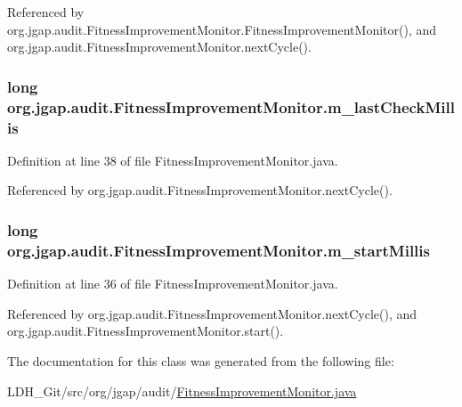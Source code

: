 Referenced by org.\-jgap.\-audit.\-Fitness\-Improvement\-Monitor.\-Fitness\-Improvement\-Monitor(), and org.\-jgap.\-audit.\-Fitness\-Improvement\-Monitor.\-next\-Cycle().

\hypertarget{classorg_1_1jgap_1_1audit_1_1_fitness_improvement_monitor_a5a5a7e91e7951e2cd6c38ca70c288245}{
\subsubsection[{m\-\_\-last\-Check\-Millis}]{\setlength{\rightskip}{0pt plus 5cm}long org.\-jgap.\-audit.\-Fitness\-Improvement\-Monitor.\-m\-\_\-last\-Check\-Millis\hspace{0.3cm}{\ttfamily [private]}}}\label{classorg_1_1jgap_1_1audit_1_1_fitness_improvement_monitor_a5a5a7e91e7951e2cd6c38ca70c288245}


Definition at line 38 of file Fitness\-Improvement\-Monitor.\-java.



Referenced by org.\-jgap.\-audit.\-Fitness\-Improvement\-Monitor.\-next\-Cycle().

\hypertarget{classorg_1_1jgap_1_1audit_1_1_fitness_improvement_monitor_ac8b211f118012e643b3ac1beebe065e4}{
\subsubsection[{m\-\_\-start\-Millis}]{\setlength{\rightskip}{0pt plus 5cm}long org.\-jgap.\-audit.\-Fitness\-Improvement\-Monitor.\-m\-\_\-start\-Millis\hspace{0.3cm}{\ttfamily [private]}}}\label{classorg_1_1jgap_1_1audit_1_1_fitness_improvement_monitor_ac8b211f118012e643b3ac1beebe065e4}


Definition at line 36 of file Fitness\-Improvement\-Monitor.\-java.



Referenced by org.\-jgap.\-audit.\-Fitness\-Improvement\-Monitor.\-next\-Cycle(), and org.\-jgap.\-audit.\-Fitness\-Improvement\-Monitor.\-start().



The documentation for this class was generated from the following file\-:\begin{DoxyCompactItemize}
\item 
L\-D\-H\-\_\-\-Git/src/org/jgap/audit/\hyperlink{_fitness_improvement_monitor_8java}{Fitness\-Improvement\-Monitor.\-java}\end{DoxyCompactItemize}
